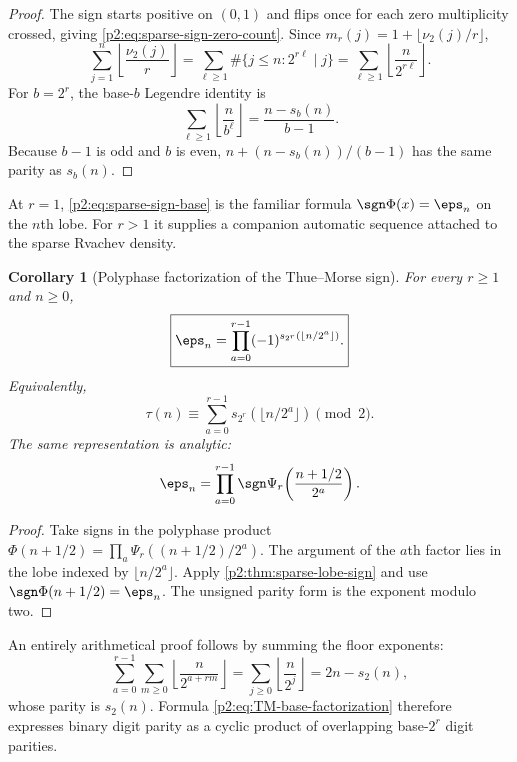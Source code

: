 \documentclass[11pt,oneside]{article}
\newtheorem{corollary}[theorem]{Corollary}
\theoremstyle{definition}
\begin{document}
\begin{proof}
The sign starts positive on $(0,1)$ and flips once for each zero multiplicity
crossed, giving \eqref{p2:eq:sparse-sign-zero-count}.  Since
$m_r(j)=1+\lfloor\nu_2(j)/r\rfloor$,
\[
 \sum_{j=1}^{n}\left\lfloor\frac{\nu_2(j)}r\right\rfloor
 =\sum_{\ell\ge1}\#\{j\le n:2^{r\ell}\mid j\}
 =\sum_{\ell\ge1}\left\lfloor\frac n{2^{r\ell}}\right\rfloor.
\]
For $b=2^r$, the base-$b$ Legendre identity is
\[
 \sum_{\ell\ge1}\left\lfloor\frac n{b^\ell}\right\rfloor
 =\frac{n-s_b(n)}{b-1}.
\]
Because $b-1$ is odd and $b$ is even,
$n+(n-s_b(n))/(b-1)$ has the same parity as $s_b(n)$.
\end{proof}

At $r=1$, \eqref{p2:eq:sparse-sign-base} is the familiar formula
$\sgn\Phi(x)=\eps_n$ on the $n$th lobe.  For $r>1$ it supplies a companion
automatic sequence attached to the sparse Rvachev density.

\begin{corollary}[Polyphase factorization of the Thue--Morse sign]
\label{p2:cor:TM-base-factorization}
For every $r\ge1$ and $n\ge0$,
\begin{equation}
 \boxed{\displaystyle
 \eps_n
 =\prod_{a=0}^{r-1}(-1)^{s_{2^r}(\lfloor n/2^a\rfloor)}.} \label{p2:eq:TM-base-factorization}
\end{equation}
Equivalently,
\begin{equation}
 \boxed{\displaystyle
 \tau(n)\equiv
 \sum_{a=0}^{r-1}s_{2^r}(\lfloor n/2^a\rfloor)\pmod2.}   \label{p2:eq:TM-base-parity}
\end{equation}
The same representation is analytic:
\begin{equation}
 \eps_n
 =\prod_{a=0}^{r-1}
   \sgn\Psi_r\!\left(\frac{n+1/2}{2^a}\right).           \label{p2:eq:TM-sparse-lobe-product}
\end{equation}
\end{corollary}

\begin{proof}
Take signs in the polyphase product
$\Phi(n+1/2)=\prod_a\Psi_r((n+1/2)/2^a)$.  The argument of the $a$th factor
lies in the lobe indexed by $\lfloor n/2^a\rfloor$.  Apply
\cref{p2:thm:sparse-lobe-sign} and use
$\sgn\Phi(n+1/2)=\eps_n$.  The unsigned parity form is the exponent modulo two.
\end{proof}

An entirely arithmetical proof follows by summing the floor exponents:
\begin{equation}
 \sum_{a=0}^{r-1}\sum_{m\ge0}
 \left\lfloor\frac{n}{2^{a+rm}}\right\rfloor
 =\sum_{j\ge0}\left\lfloor\frac{n}{2^j}\right\rfloor
 =2n-s_2(n),                                               \label{p2:eq:floor-polyphase-TM}
\end{equation}
whose parity is $s_2(n)$.  Formula
\eqref{p2:eq:TM-base-factorization} therefore expresses binary digit parity as a
cyclic product of overlapping base-$2^r$ digit parities.
\end{document}
